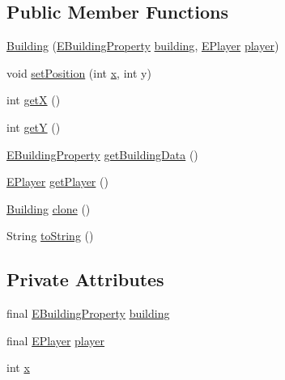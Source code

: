 \subsection*{Public Member Functions}
\begin{DoxyCompactItemize}
\item 
\mbox{\hyperlink{classgame_1_1board_1_1_building_a6b8b4d376b57c78e14e8f6f61a046954}{Building}} (\mbox{\hyperlink{enumrule_engine_1_1entity_1_1_e_building_property}{E\+Building\+Property}} \mbox{\hyperlink{classgame_1_1board_1_1_building_a4f905b41f654e5afe243617cf5c59f50}{building}}, \mbox{\hyperlink{enumgame_1_1_e_player}{E\+Player}} \mbox{\hyperlink{classgame_1_1board_1_1_building_a60c834aa2a767a28d1e09af4e43ff4ca}{player}})
\item 
void \mbox{\hyperlink{classgame_1_1board_1_1_building_a837a192497b120047756657004faf3da}{set\+Position}} (int \mbox{\hyperlink{classgame_1_1board_1_1_building_a8893575c63f6eb2481a06061eade1263}{x}}, int y)
\item 
int \mbox{\hyperlink{classgame_1_1board_1_1_building_a4b3b28df2d7385677d3f2d08d06797bd}{getX}} ()
\item 
int \mbox{\hyperlink{classgame_1_1board_1_1_building_a22ef281a4c474219d4eff1e5bdc0b4b8}{getY}} ()
\item 
\mbox{\hyperlink{enumrule_engine_1_1entity_1_1_e_building_property}{E\+Building\+Property}} \mbox{\hyperlink{classgame_1_1board_1_1_building_a270e3f351d616701d68b776b054a1b63}{get\+Building\+Data}} ()
\item 
\mbox{\hyperlink{enumgame_1_1_e_player}{E\+Player}} \mbox{\hyperlink{classgame_1_1board_1_1_building_a68a617688a9b58a7534c5e32afeb478f}{get\+Player}} ()
\item 
\mbox{\hyperlink{classgame_1_1board_1_1_building}{Building}} \mbox{\hyperlink{classgame_1_1board_1_1_building_a16638e9e0998a6e18c5beba410cfdf66}{clone}} ()
\item 
String \mbox{\hyperlink{classgame_1_1board_1_1_building_a0030bb1dbadf82ef1fc54c01d19e99d0}{to\+String}} ()
\end{DoxyCompactItemize}
\subsection*{Private Attributes}
\begin{DoxyCompactItemize}
\item 
final \mbox{\hyperlink{enumrule_engine_1_1entity_1_1_e_building_property}{E\+Building\+Property}} \mbox{\hyperlink{classgame_1_1board_1_1_building_a4f905b41f654e5afe243617cf5c59f50}{building}}
\item 
final \mbox{\hyperlink{enumgame_1_1_e_player}{E\+Player}} \mbox{\hyperlink{classgame_1_1board_1_1_building_a60c834aa2a767a28d1e09af4e43ff4ca}{player}}
\item 
int \mbox{\hyperlink{classgame_1_1board_1_1_building_a8893575c63f6eb2481a06061eade1263}{x}}
\end{DoxyCompactItemize}


